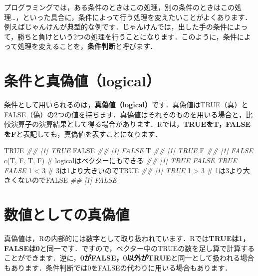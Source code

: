 \documentclass[
  letterpaper,
  DIV=11,
  numbers=noendperiod]{scrreprt}
\newenvironment{Shaded}{\begin{snugshade}}{\end{snugshade}}
\newcommand{\CommentTok}[1]{\textcolor[rgb]{0.37,0.37,0.37}{#1}}
\newcommand{\ConstantTok}[1]{\textcolor[rgb]{0.56,0.35,0.01}{#1}}
\newcommand{\DecValTok}[1]{\textcolor[rgb]{0.68,0.00,0.00}{#1}}
\newcommand{\DocumentationTok}[1]{\textcolor[rgb]{0.37,0.37,0.37}{\textit{#1}}}
\newcommand{\FunctionTok}[1]{\textcolor[rgb]{0.28,0.35,0.67}{#1}}
\newcommand{\NormalTok}[1]{\textcolor[rgb]{0.00,0.23,0.31}{#1}}
\newcommand{\SpecialCharTok}[1]{\textcolor[rgb]{0.37,0.37,0.37}{#1}}
\begin{document}
プログラミングでは，ある条件のときはこの処理，別の条件のときはこの処理\ldots，といった具合に，条件によって行う処理を変えたいことがよくあります．例えばじゃんけんが典型的な例です．じゃんけんでは，出した手の条件によって，勝ちと負けという2つの処理を行うことになります．このように，条件によって処理を変えることを，\textbf{条件判断}と呼びます．

\hypertarget{ux6761ux4ef6ux3068ux771fux507dux5024logical}{%
\section{条件と真偽値（logical）}\label{ux6761ux4ef6ux3068ux771fux507dux5024logical}}

条件として用いられるのは，\textbf{真偽値（logical）}です．真偽値はTRUE（真）とFALSE（偽）の2つの値を持ちます．真偽値はそれそのものを用いる場合と，比較演算子の演算結果として得る場合があります．Rでは，\textbf{TRUEをT，FALSEをF}と表記しても，真偽値を表すことになります．

\textbf{}

\begin{Shaded}
\begin{Highlighting}[]
\ConstantTok{TRUE}
\DocumentationTok{\#\# [1] TRUE}
\ConstantTok{FALSE}
\DocumentationTok{\#\# [1] FALSE}
\NormalTok{T}
\DocumentationTok{\#\# [1] TRUE}
\NormalTok{F}
\DocumentationTok{\#\# [1] FALSE}
\FunctionTok{c}\NormalTok{(T, F, T, F) }\CommentTok{\# logicalはベクターにもできる}
\DocumentationTok{\#\# [1]  TRUE FALSE  TRUE FALSE}
\DecValTok{1} \SpecialCharTok{\textless{}} \DecValTok{3} \CommentTok{\# 3は1より大きいのでTRUE}
\DocumentationTok{\#\# [1] TRUE}
\DecValTok{1} \SpecialCharTok{\textgreater{}} \DecValTok{3} \CommentTok{\# 1は3より大きくないのでFALSE}
\DocumentationTok{\#\# [1] FALSE}
\end{Highlighting}
\end{Shaded}

\hypertarget{ux6570ux5024ux3068ux3057ux3066ux306eux771fux507dux5024}{%
\section{数値としての真偽値}\label{ux6570ux5024ux3068ux3057ux3066ux306eux771fux507dux5024}}

真偽値は，Rの内部的には数字として取り扱われています．Rでは\textbf{TRUEは1，FALSEは0}と同一です．ですので，ベクター中のTRUEの数を足し算で計算することができます．逆に，\textbf{0がFALSE，0以外がTRUE}と同一として扱われる場合もあります．条件判断では0をFALSEの代わりに用いる場合もあります．
\end{document}
